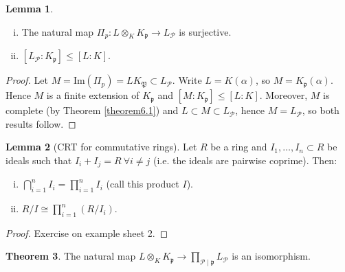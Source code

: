 \documentclass{article}
\theoremstyle{definition}
\newtheorem{theorem}{Theorem}[section]
\newtheorem{lemma}[theorem]{Lemma}
\begin{document}
\begin{lemma}\label{lemma10.7}
    \begin{enumerate}[(i)]
        \item The natural map $\Pi_p : L \otimes_K K_{\mathfrak{p}} \to L_{\mathcal{P}}$ is surjective.
        \item $[L_{\mathcal{P}}:K_{\mathfrak{p}}]\le [L:K]$.
    \end{enumerate}
\end{lemma}
\begin{proof}
    Let $M = \text{Im}(\Pi_p) = LK_{\mathfrak{P}} \subset L_\mathcal{P}$. Write $L = K(\alpha)$, so $M = K_{\mathfrak{p}}(\alpha)$. Hence $M$ is a finite extension of $K_{\mathfrak{p}}$ and $[M:K_{\mathfrak{p}}]\le [L:K]$. Moreover, $M$ is complete (by Theorem \ref{theorem6.1}) and $L \subset M \subset L_{\mathcal{P}}$, hence $M = L_{\mathcal{P}}$, so both results follow.
\end{proof}
\begin{lemma}[CRT for commutative rings]
    Let $R$ be a ring and $I_1,\ldots,I_n \subset R$ be ideals such that $I_i + I_j = R ~\forall i \neq j$ (i.e. the ideals are pairwise coprime). Then:
    \begin{enumerate}[(i)]
        \item $\bigcap_{i=1}^n I_i = \prod_{i=1}^{n} I_i$ (call this product $I$).
        \item $R/I \cong \prod_{i=1}^{n} (R/I_i)$.
    \end{enumerate}
\end{lemma}
\begin{proof}
    Exercise on example sheet 2.
\end{proof}
\begin{theorem}
    The natural map $L \otimes_K K_{\mathfrak{p}} \to \prod_{\mathcal{P} \mid \mathfrak{p}}^{} L_{\mathcal{P}}$ is an isomorphism.
\end{theorem}
\end{document}

